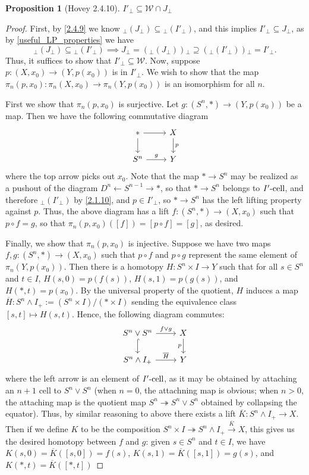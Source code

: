 \documentclass{amsart}
\newcommand{\ol}{\overline}
\theoremstyle{plain}
\newtheorem{proposition}[theorem]{Proposition}
\theoremstyle{definition}
\newcommand{\sseq}{\subseteq}
\newcommand{\spseq}{\supseteq}
\newcommand{\0}{\mathbf{0}}
\newcommand{\p}{{_\perp}}
\newcommand{\onto}{\twoheadrightarrow}
\newcommand{\cW}{\mathcal W}
\renewcommand{\ol}{\overline}
\renewcommand{\(}{\left(}
\renewcommand{\)}{\right)}
\newcommand{\cell}{\text-\mathrm{cell}}
\begin{document}
\begin{proposition}[Hovey 2.4.10]\label{2.4.10}
  $I'\p\sseq\cW\cap J\p$
\end{proposition}
\begin{proof}
  First, by \autoref{2.4.9} we know $\p(J\p)\sseq\p(I'\p)$, and this implies $I'\p\sseq J\p$, as by \autoref{useful_LP_properties} we have
  \[\p(J\p)\sseq\p(I'\p)\implies J\p=(\p(J\p))\p\spseq(\p(I'\p))\p=I'\p.\]
  Thus, it suffices to show that $I'\p\sseq\cW$. Now, suppose $p:(X,x_0)\to (Y,p(x_0))$ is in $I'\p$. We wish to show that the map $\pi_n(p,x_0):\pi_n(X,x_0)\to\pi_n(Y,p(x_0))$ is an isomorphism for all $n$.
  
  First we show that $\pi_n(p,x_0)$ is surjective. Let $g:(S^n,\ast)\to(Y,p(x_0))$ be a map. Then we have the following commutative diagram
  \[\begin{tikzcd}
    \ast & X \\
    {S^n} & Y
    \arrow[from=1-1, to=2-1]
    \arrow["g", from=2-1, to=2-2]
    \arrow[from=1-1, to=1-2]
    \arrow["p", from=1-2, to=2-2]
  \end{tikzcd}\]
  where the top arrow picks out $x_0$. Note that the map $\ast\to S^n$ may be realized as a pushout of the diagram $D^n\leftarrow S^{n-1}\rightarrow\ast$, so that $\ast\to S^n$ belongs to $I'\cell$, and therefore $\p(I'\p)$ by \autoref{2.1.10}, and $p\in I'\p$, so $\ast\to S^n$ has the left lifting property against $p$. Thus, the above diagram has a lift $f:(S^n,\ast)\to (X,x_0)$ such that $p\circ f=g$, so that $\pi_n(p,x_0)([f])=[p\circ f]=[g]$, as desired.

  Finally, we show that $\pi_n(p,x_0)$ is injective. Suppose we have two maps $f,g:(S^n,\ast)\to(X,x_0)$ such that $p\circ f$ and $p\circ g$ represent the same element of $\pi_n(Y,p(x_0))$. Then there is a homotopy $H:S^n\times I\to Y$ such that for all $s\in S^n$ and $t\in I$, $H(s,0)=p(f(s))$, $H(s,1)=p(g(s))$, and $H(\ast,t)=p(x_0)$. By the universal property of the quotient, $H$ induces a map $\ol H:S^n\wedge I_+:=(S^n\times I)/(\ast\times I)$ sending the equivalence class $[s,t]\mapsto H(s,t)$. Hence, the following diagram commutes:
  \[\begin{tikzcd}
    {S^n\vee S^n} & X \\
    {S^n\wedge I_+} & Y
    \arrow[hook, from=1-1, to=2-1]
    \arrow["{\ol H}", from=2-1, to=2-2]
    \arrow["{f\vee g}", from=1-1, to=1-2]
    \arrow["p"', from=1-2, to=2-2]
  \end{tikzcd}\]
  where the left arrow is an element of $I'\cell$, as it may be obtained by attaching an $n+1$ cell to $S^n\vee S^n$ (when $n=0$, the attachning map is obvious; when $n>0$, the attaching map is the quotient map $S^n\onto S^n\vee S^n$ obtained by collapsing the equator). Thus, by similar reasoning to above there exists a lift $\ol K: S^n\wedge I_+\to X$. Then if we define $K$ to be the composition $S^n\times I\onto S^n\wedge I_+\xrightarrow{\ol K} X$, this gives us the desired homotopy between $f$ and $g$: given $s\in S^n$ and $t\in I$, we have $K(s,0)=\ol K([s,0])=f(s)$, $K(s,1)=\ol K([s,1])=g(s)$, and $K(\ast,t)=\ol K([\ast,t])$
\end{proof}
\end{document}
